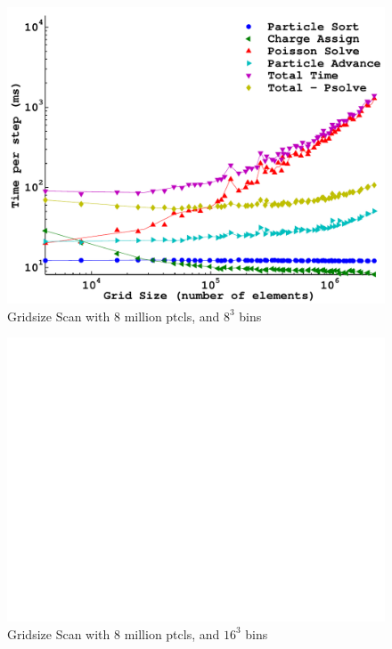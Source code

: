 \begin{figure}[H]
\begin{center}
\includegraphics[width=6in]{performance/gridsize_scan8ptcls8bins.pdf}
\end{center}
\caption{Gridsize Scan with 8 million ptcls, and $8^3$ bins}
\label{fig:grid_scan8ptcls8bins}
\end{figure}


\begin{figure}[H]
\begin{center}
\includegraphics[width=6in]{performance/gridsize_scan8ptcls16bins.pdf}
\end{center}
\caption{Gridsize Scan with 8 million ptcls, and $16^3$ bins}
\label{fig:grid_scan8ptcls16bins}
\end{figure}


